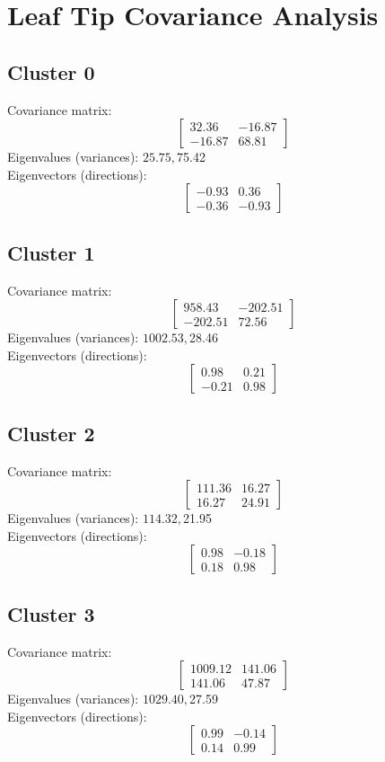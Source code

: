 \documentclass{article}
\begin{document}
\section*{Leaf Tip Covariance Analysis}
\subsection*{Cluster 0}
Covariance matrix:
\[\begin{bmatrix}32.36 & -16.87 \\-16.87 & 68.81\end{bmatrix}\]
Eigenvalues (variances): $ 25.75, $75.42\\
Eigenvectors (directions):
\[\begin{bmatrix}-0.93 & 0.36 \\-0.36 & -0.93\end{bmatrix}\]
\subsection*{Cluster 1}
Covariance matrix:
\[\begin{bmatrix}958.43 & -202.51 \\-202.51 & 72.56\end{bmatrix}\]
Eigenvalues (variances): $ 1002.53, $28.46\\
Eigenvectors (directions):
\[\begin{bmatrix}0.98 & 0.21 \\-0.21 & 0.98\end{bmatrix}\]
\subsection*{Cluster 2}
Covariance matrix:
\[\begin{bmatrix}111.36 & 16.27 \\16.27 & 24.91\end{bmatrix}\]
Eigenvalues (variances): $ 114.32, $21.95\\
Eigenvectors (directions):
\[\begin{bmatrix}0.98 & -0.18 \\0.18 & 0.98\end{bmatrix}\]
\subsection*{Cluster 3}
Covariance matrix:
\[\begin{bmatrix}1009.12 & 141.06 \\141.06 & 47.87\end{bmatrix}\]
Eigenvalues (variances): $ 1029.40, $27.59\\
Eigenvectors (directions):
\[\begin{bmatrix}0.99 & -0.14 \\0.14 & 0.99\end{bmatrix}\]
\end{document}

